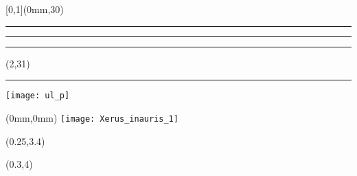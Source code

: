 
\begingroup
{}
\textblockorigin{0mm}{0mm}
\setlength{\parindent}{0mm}
\setlength{\imageheight}{29\TPVertModule}
\setlength{\banderougewidth}{2\TPHorizModule}
\setlength{\banderougeheight}{\TPVertModule}
\setlength{\bandeorwidth}{\TPHorizModule}
\setlength{\bandeorheight}{\banderougeheight}
\setlength{\logoheight}{2.5\TPVertModule}
\setlength{\gapwidth}{1.5pt}
\addtolength{\bandeorwidth}{-\gapwidth}
\addtolength{\imageheight}{-\gapwidth}
\setlength{\fboxrule}{3pt}
\setlength{\fboxsep}{0pt}

\def\titlefmt{%
  \sffamily\bfseries\fontsize{52}{52}\selectfont\thetitle}
\def\authorfmt{%
  \sffamily\mdseries\fontsize{30}{38}\selectfont\theauthor}
\def\affiliation{%
  \sffamily\mdseries\fontsize{22}{26}\selectfont
  Professeur titulaire \\
  École d'actuariat, Université Laval}
\def\edition{%
  \sffamily\mdseries\fontsize{22}{26}\selectfont
  Édition {\fullcaps\year}.\month}

\begin{textblock*}{\paperwidth}[0,1](0mm,30\TPVertModule)
  \textcolor{rouge}{\rule{\banderougewidth}{\banderougeheight}}%
  \rule{\gapwidth}{0pt}%
  \textcolor{or}{\rule{\bandeorwidth}{\bandeorheight}}           %
\end{textblock*}

\begin{textblock*}{\TPHorizModule}(2\TPHorizModule,31\TPVertModule)
  \rule{\gapwidth}{0pt}%
  \texttt{[image: ul\_p]}
\end{textblock*}

\begin{textblock*}{\paperwidth}(0mm,0mm)
  \texttt{[image: Xerus\_inauris\_1]}
\end{textblock*}

\begin{textblock*}{\paperwidth}(0.25\TPHorizModule,3.4\TPVertModule)
  \fbox{\textcolor{white}{\rule{2.27\TPHorizModule}{2.9\TPVertModule}}}
\end{textblock*}
\begin{textblock*}{\paperwidth}(0.3\TPHorizModule,4\TPVertModule)
  \titlefmt
\end{textblock*}

